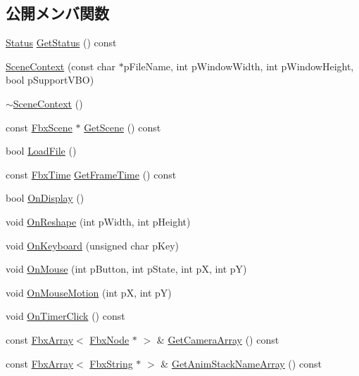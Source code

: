 \subsection*{公開メンバ関数}
\begin{DoxyCompactItemize}
\item 
\hyperlink{class_scene_context_ad0fdb258c51900e90cc206ecdff267d1}{Status} \hyperlink{class_scene_context_af33ba9000594fd8bce536c99bb4aae4e}{Get\+Status} () const
\item 
\hyperlink{class_scene_context_a9c88d7d278908ac5b2a8ec62b5eac5ed}{Scene\+Context} (const char $\ast$p\+File\+Name, int p\+Window\+Width, int p\+Window\+Height, bool p\+Support\+V\+BO)
\item 
\hyperlink{class_scene_context_ad8768b5caaf784be9cd21f7dd5c2f4c8}{$\sim$\+Scene\+Context} ()
\item 
const \hyperlink{class_fbx_scene}{Fbx\+Scene} $\ast$ \hyperlink{class_scene_context_acdfe66cd9b8838bda8d266769fcad915}{Get\+Scene} () const
\item 
bool \hyperlink{class_scene_context_ae0e2269a6a0df27ec32114282c52f812}{Load\+File} ()
\item 
const \hyperlink{class_fbx_time}{Fbx\+Time} \hyperlink{class_scene_context_a0a8ec2998e945ddf669ad263759e14d4}{Get\+Frame\+Time} () const
\item 
bool \hyperlink{class_scene_context_a757f3c7f7824e77bbce4a3baf9490ac6}{On\+Display} ()
\item 
void \hyperlink{class_scene_context_ab90174ca8b46fd0605bdafa2feb34bbb}{On\+Reshape} (int p\+Width, int p\+Height)
\item 
void \hyperlink{class_scene_context_a0a885b57e382b9e5057b0cae7b96de61}{On\+Keyboard} (unsigned char p\+Key)
\item 
void \hyperlink{class_scene_context_a661e2afdb07136789ca6e63f73a22801}{On\+Mouse} (int p\+Button, int p\+State, int pX, int pY)
\item 
void \hyperlink{class_scene_context_ad684c731a852c7af58a433b596564d82}{On\+Mouse\+Motion} (int pX, int pY)
\item 
void \hyperlink{class_scene_context_ad2cd3fb0710e845b5cc7ad3cfc8abaeb}{On\+Timer\+Click} () const
\item 
const \hyperlink{class_fbx_array}{Fbx\+Array}$<$ \hyperlink{class_fbx_node}{Fbx\+Node} $\ast$ $>$ \& \hyperlink{class_scene_context_af91e35c678853d0656e17df1ed164a19}{Get\+Camera\+Array} () const
\item 
const \hyperlink{class_fbx_array}{Fbx\+Array}$<$ \hyperlink{class_fbx_string}{Fbx\+String} $\ast$ $>$ \& \hyperlink{class_scene_context_a343b99a8d1d13c3b4e2071a539512193}{Get\+Anim\+Stack\+Name\+Array} () const

\end{DoxyCompactItemize}
